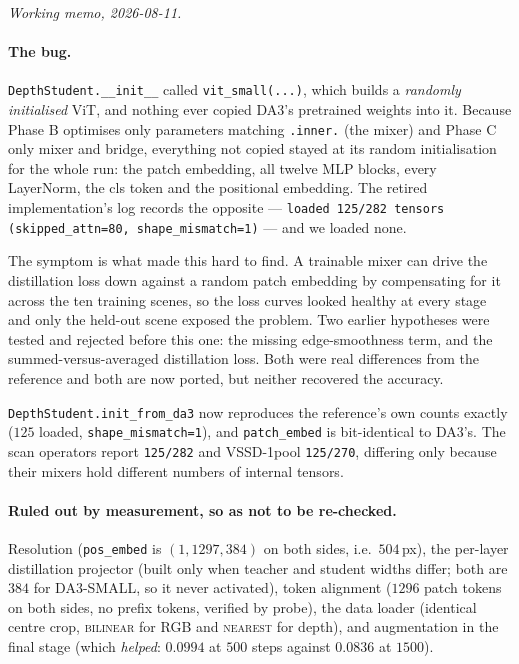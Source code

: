 \documentclass[11pt,a4paper]{article}
\begin{document}
\emph{Working memo, 2026-08-11.}

\paragraph{The bug.} \texttt{DepthStudent.\_\_init\_\_} called \texttt{vit\_small(...)}, which
builds a \emph{randomly initialised} ViT, and nothing ever copied DA3's pretrained weights into
it. Because Phase B optimises only parameters matching \texttt{.inner.} (the mixer) and Phase C
only mixer and bridge, everything not copied stayed at its random initialisation for the whole
run: the patch embedding, all twelve MLP blocks, every LayerNorm, the cls token and the
positional embedding. The retired implementation's log records the opposite ---
\texttt{loaded 125/282 tensors (skipped\_attn=80, shape\_mismatch=1)} --- and we loaded none.

The symptom is what made this hard to find. A trainable mixer can drive the distillation loss
down against a random patch embedding by compensating for it across the ten training scenes, so
the loss curves looked healthy at every stage and only the held-out scene exposed the problem.
Two earlier hypotheses were tested and rejected before this one: the missing edge-smoothness
term, and the summed-versus-averaged distillation loss. Both were real differences from the
reference and both are now ported, but neither recovered the accuracy.

\texttt{DepthStudent.init\_from\_da3} now reproduces the reference's own counts exactly
($125$ loaded, \texttt{shape\_mismatch=1}), and \texttt{patch\_embed} is bit-identical to
DA3's. The scan operators report \texttt{125/282} and VSSD-1pool \texttt{125/270}, differing
only because their mixers hold different numbers of internal tensors.

\paragraph{Ruled out by measurement, so as not to be re-checked.} Resolution
(\texttt{pos\_embed} is $(1,1297,384)$ on both sides, i.e.\ $504$\,px), the per-layer
distillation projector (built only when teacher and student widths differ; both are $384$ for
DA3-SMALL, so it never activated), token alignment ($1296$ patch tokens on both sides, no prefix
tokens, verified by probe), the data loader (identical centre crop, \textsc{bilinear} for RGB and
\textsc{nearest} for depth), and augmentation in the final stage (which \emph{helped}:
$0.0994$ at $500$ steps against $0.0836$ at $1500$).
\end{document}
